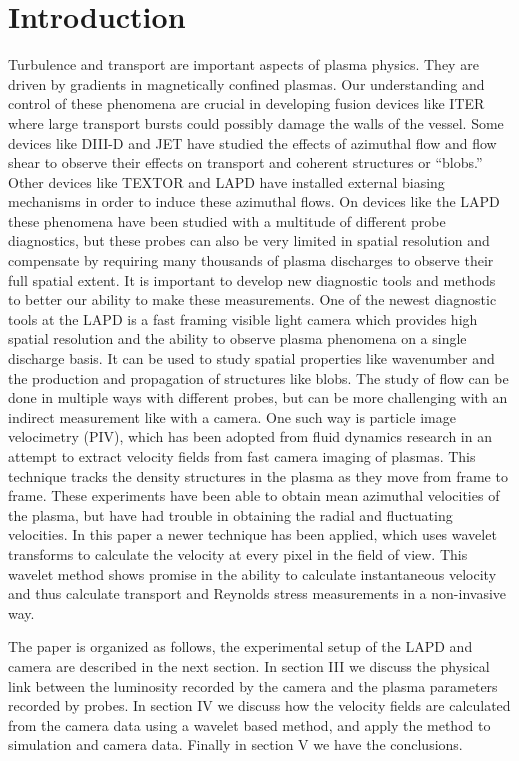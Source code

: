 \documentclass{jpp}
\begin{document}
\section{Introduction}
Turbulence and transport are important aspects of plasma physics. They are driven by gradients in magnetically confined plasmas. Our understanding and control of these phenomena are crucial in developing fusion devices like ITER where large transport bursts could possibly damage the walls of the vessel. Some devices like DIII-D \citep{mckee03} and JET \citep{xu09} have studied the effects of azimuthal flow and flow shear to observe their effects on transport and coherent structures or “blobs.” Other devices like TEXTOR \citep{jachmich98} and LAPD \citep{Carter09,schaffner12,schaffner13} have installed external biasing mechanisms in order to induce these azimuthal flows. On devices like the LAPD these phenomena have been studied with a multitude of different probe diagnostics, but these probes can also be very limited in spatial resolution and compensate by requiring many thousands of plasma discharges to observe their full spatial extent. It is important to develop new diagnostic tools and methods to better our ability to make these measurements. One of the newest diagnostic tools at the LAPD is a fast framing visible light camera which provides high spatial resolution and the ability to observe plasma phenomena on a single discharge basis. It can be used to study spatial properties like wavenumber and the production and propagation of structures like blobs. The study of flow can be done in multiple ways with different probes, but can be more challenging with an indirect measurement like with a camera. One such way is particle image velocimetry (PIV), which has been adopted from fluid dynamics research \citep{oldenburger10} in an attempt to extract velocity fields from fast camera imaging of plasmas. This technique tracks the density structures in the plasma as they move from frame to frame. These experiments have been able to obtain mean azimuthal velocities of the plasma, but have had trouble in obtaining the radial and fluctuating velocities. In this paper a newer technique \citep{chaston10} has been applied, which uses wavelet transforms to calculate the velocity at every pixel in the field of view. This wavelet method shows promise in the ability to calculate instantaneous velocity and thus calculate transport and Reynolds stress measurements in a non-invasive way.

The paper is organized as follows, the experimental setup of the LAPD and camera are described in the next section. In section III we discuss the physical link between the luminosity recorded by the camera and the plasma parameters recorded by probes. In section IV we discuss how the velocity fields are calculated from the camera data using a wavelet based method, and apply the method to simulation and camera data. Finally in section V we have the conclusions.
 
\end{document}

